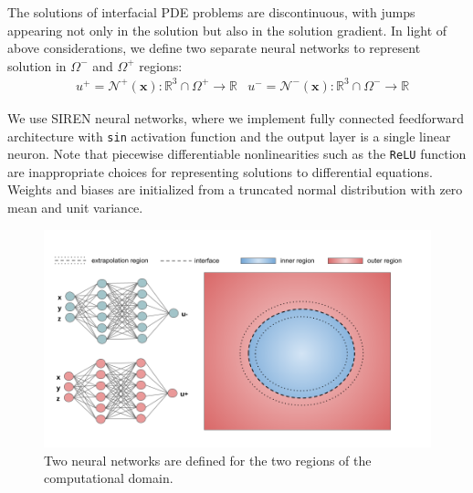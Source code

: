 \documentclass{elsarticle}
\begin{document}
The solutions of interfacial PDE problems are discontinuous, with jumps appearing not only in the solution but also in the solution gradient. In light of above considerations, we define two separate neural networks to represent solution in $\Omega^-$ and $\Omega^+$ regions:
\begin{align*}
& u^+ = \mathcal{N}^+(\mathbf{x}): \mathbb{R}^3\cap \Omega^+ \rightarrow \mathbb{R}  & u^- = \mathcal{N}^-(\mathbf{x}): \mathbb{R}^3\cap \Omega^- \rightarrow \mathbb{R}
\end{align*}

We use SIREN neural networks, where we implement fully connected feedforward architecture with \texttt{sin} activation function and the output layer is a single linear neuron. Note that piecewise differentiable nonlinearities such as the \texttt{ReLU} function are inappropriate choices for representing solutions to differential equations. Weights and biases are initialized from a truncated normal distribution with zero mean and unit variance. 




\begin{figure}[ht]
	\centering
	\includegraphics[width=\linewidth]{./figures/neural_network_arch.png}
	\caption{Two neural networks are defined for the two regions of the computational domain.}
	\label{fig:shapes}
\end{figure}
\end{document}
